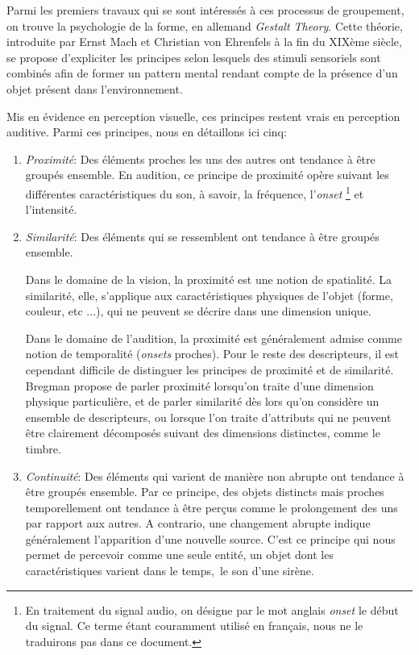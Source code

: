 Parmi les premiers travaux qui se sont intéressés à ces processus de groupement, on trouve la psychologie de la forme, en allemand \emph{Gestalt Theory}. Cette théorie, introduite par Ernst Mach et Christian von Ehrenfels à la fin du XIXème siècle, se propose d'expliciter les principes selon lesquels des stimuli sensoriels sont combinés afin de former un pattern mental rendant compte de la présence d'un objet présent dans l'environnement.

Mis en évidence en perception visuelle, ces principes restent vrais en perception auditive\citep[ch. 1]{bregman1994auditory}. Parmi ces principes, nous en détaillons ici cinq:

\begin{enumerate}
\item \emph{Proximité}: Des éléments proches les uns des autres ont tendance à être groupés ensemble. En audition, ce principe de proximité opère suivant les différentes caractéristiques du son, à savoir, la fréquence, l'\emph{onset} \footnote{En traitement du signal audio, on désigne par le mot anglais \emph{onset} le début du signal. Ce terme étant couramment utilisé en français, nous ne le traduirons pas dans ce document.} et l'intensité.
 
\item \emph{Similarité}: Des éléments qui se ressemblent ont tendance à être groupés ensemble. 

Dans le domaine de la vision, la proximité est une notion de spatialité. La similarité, elle, s'applique aux caractéristiques physiques de l'objet (forme, couleur, etc $\ldots$), qui ne peuvent se décrire dans une dimension unique. 

Dans le domaine de l'audition, la proximité est généralement admise comme notion de temporalité (\emph{onsets} proches). Pour le reste des descripteurs, il est cependant difficile de distinguer les principes de proximité et de similarité. Bregman propose de parler proximité lorsqu'on traite d'une dimension physique particulière, et de parler similarité dès lors qu'on considère un ensemble de descripteurs, ou lorsque l'on traite d'attributs qui ne peuvent être clairement décomposés suivant des dimensions distinctes, comme le timbre.

\item \emph{Continuité}: Des éléments qui varient de manière non abrupte ont tendance à être groupés ensemble. Par ce principe, des objets distincts mais proches temporellement  ont tendance à être perçus comme le prolongement des uns par rapport aux autres. A contrario, une changement abrupte indique généralement l'apparition d'une nouvelle source. C'est ce principe qui nous permet de percevoir comme une seule entité, un objet dont les caractéristiques varient dans le temps,\eg~le son d'une sirène.


\end{enumerate}
